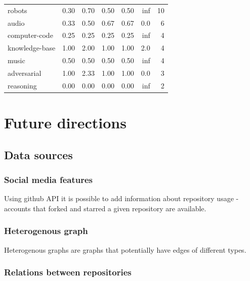 \documentclass[longabstract,mgr,english]{iithesis}
\begin{document}
{\begin{center}
\begin{tabular}{p{1cm}rrrrrr}
robots                      &     0.30 &         0.70 &          0.50 &              0.50 &                    inf &    10 \\
audio                       &     0.33 &         0.50 &          0.67 &              0.67 &                    0.0 &     6 \\
computer-code               &     0.25 &         0.25 &          0.25 &              0.25 &                    inf &     4 \\
knowledge-base              &     1.00 &         2.00 &          1.00 &              1.00 &                    2.0 &     4 \\
music                       &     0.50 &         0.50 &          0.50 &              0.50 &                    inf &     4 \\
adversarial                 &     1.00 &         2.33 &          1.00 &              1.00 &                    0.0 &     3 \\
reasoning                   &     0.00 &         0.00 &          0.00 &              0.00 &                    inf &     2 \\
\bottomrule
\end{tabular}
\end{center}
}

\chapter{Future directions}

\section{Data sources}

\subsection{Social media features}

Using github API it is possible to add information about repository usage -
accounts that forked and starred a given repository are available.

\subsection{Heterogenous graph}

Heterogenous graphs are graphs that potentially have edges of different types\cite{hetero_graphs}.


\subsection{Relations between repositories}
\end{document}
